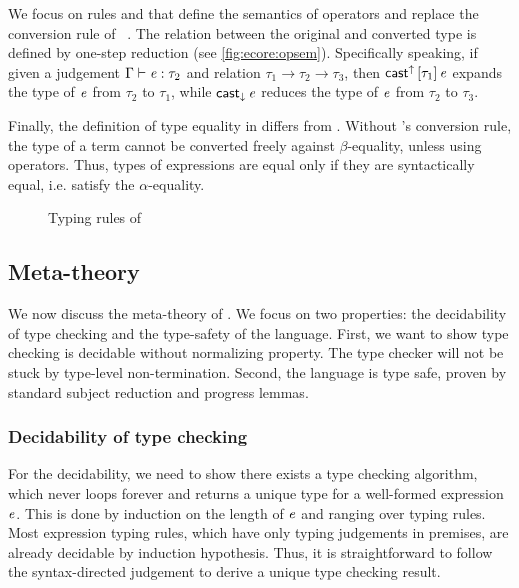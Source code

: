We focus on rules  and  that define the semantics of \cast operators and replace the conversion rule of \cc~. The relation between the original and converted type is defined by one-step reduction (see \ref{fig:ecore:opsem}). Specifically speaking, if given a judgement $\Gamma  \vdash  \mathit{e}  :  \tau_{{\mathrm{2}}}$ and relation $\tau_{{\mathrm{1}}}  \longrightarrow  \tau_{{\mathrm{2}}}  \longrightarrow  \tau_{{\mathrm{3}}}$, then $\mathsf{cast}^{\uparrow} \, [  \tau_{{\mathrm{1}}}  ] \,  \mathit{e}$ expands the type of $\mathit{e}$ from $\tau_{{\mathrm{2}}}$ to $\tau_{{\mathrm{1}}}$, while $\mathsf{cast}_{\downarrow} \, \mathit{e}$ reduces the type of $\mathit{e}$ from $\tau_{{\mathrm{2}}}$ to $\tau_{{\mathrm{3}}}$.

Finally, the definition of type equality in \ecore differs from \cc. Without \cc's conversion rule, the type of a term cannot be converted freely against $\beta$-equality, unless using \cast operators. Thus, types of expressions are equal only if they are syntactically equal, i.e. satisfy the $\alpha$-equality.

\begin{figure}
    \ottdefnctx{}
    \ottdefnexpr{}
    \caption{Typing rules of \ecore}
    \label{fig:ecore:typing}
\end{figure}

\subsection{Meta-theory}\label{sec:ecore:meta}
We now discuss the meta-theory of \ecore. We focus on two properties: the decidability of type checking and the type-safety of the language. First, we want to show type checking \ecore is decidable without normalizing property. The type checker will not be stuck by type-level non-termination. Second, the language is type safe, proven by standard subject reduction and progress lemmas.

\subsubsection{Decidability of type checking}
For the decidability, we need to show there exists a type checking algorithm, which never loops forever and returns a unique type for a well-formed expression $\mathit{e}$. This is done by induction on the length of $\mathit{e}$ and ranging over typing rules. Most expression typing rules, which have only typing judgements in premises, are already decidable by induction hypothesis. Thus, it is straightforward to follow the syntax-directed judgement to derive a unique type checking result.

